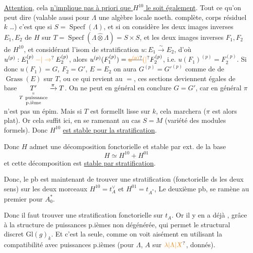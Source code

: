 \uline{Attention}, cela \uline{n'implique pas à priori que $H^{10}$ le
soit également}. Tout ce qu'on peut dire (valable
aussi pour $\Lambda$ une algèbre locale noeth. complète,
corps résiduel $k$ \ldots) c'est que si $S=\operatorname{Specf}(\Lambda)$,
et si on considère les deux images inverses
$E_1,E_2$ de $H$ sur  $T=\operatorname{Specf}(\Lambda\widehat\otimes\Lambda)=S\times S$,
 et les deux images inverses $F_1,F_2$ de $H^{10}$,
et considérant l'isom de stratification
$u:E_1\xrightarrow{\sim}E_2$, d'où $u^{(p)}:E_1^{(p)}\mathbin{\unsure{-|\to}}E_2^{(p)}$,
alors $u^{(p)}(F_1^{(p)})=\deleted{\unsure{u^{(p)}}}\unsure{(|{}}F_2^{(p)}$, i.e.
$u(F_1)^{(p)}=F_2^{(p)}$. Si donc $u(F_1)=G$, $F_2=G'$, $E=E_2$
on aura $G^{(p)}=G'^{(p)}$ comme  de
de $\operatorname{Grass}(E)$ sur $T$, ou ce qui revient au
$=$, ces sections deviennent égales   de base
$\underset{\substack{\shortparallel\\T\ \text{puissance}\\\text{p.ième}}}{T'}\xrightarrow{\pi}T$. On ne peut en général en
conclure $G=G'$, car en général $\pi$ n'est pas un
épim. Mais si  $T$ est formellt lisse sur $k$,
cela marchera ($\pi$ est alors  plat). Or cela suffit ici,
en se ramenant au cas $S=M$ (variété des modules
formels). Donc $H^{10}$ \uline{est stable pour la stratification}.

Donc $H$ admet une décomposition fonctorielle
et stable par ext. de la base
\[
H\simeq H^{10}+H^{01}
\]
et cette décomposition est \uline{stable par stratification}.

Donc, le pb est maintenant de trouver une
stratification  (fonctorielle ds les deux sens)
sur les deux morceaux $H^{10}=t_A^\vee$ et $H^{01}=t_{A^*}$,
Le deuxième pb,  se ramène au premier pour $A_0^*$.

Donc il faut trouver une stratification fonctorielle sur
$t_A$. Or il y en a déjà , grâce à la structure
de puissances p.ièmes non dégénérée, qui
permet  le  structural
discret $\mathrm{Gl}(g)_k$. Et c'est la seule,  comme on voit
aisément en utilisant la compatibilité avec 
puissances p.ièmes (pour $\Lambda$, $A$ sur $\unsure{\lambda|\Lambda|X}$, donnés).


